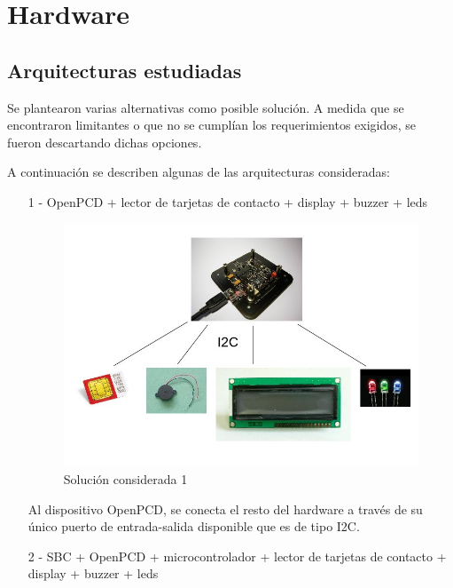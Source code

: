 \chapter{Hardware}

\section{Arquitecturas estudiadas}
Se plantearon varias alternativas como posible solución. A medida que se encontraron limitantes o que no se cumplían los requerimientos exigidos, se fueron descartando dichas opciones.

A continuación se describen algunas de las arquitecturas consideradas:

\begin{itemize}
\item[1 -] OpenPCD + lector de tarjetas de contacto + display + buzzer + leds
\bigskip

\begin{figure}[H]
\centering
  \begin{center}
  \includegraphics[scale=.4]{Imagenes/0.jpg} 
  \end{center}
  \caption{Solución considerada 1}\label{Fig:HW1} 
\end{figure}

\newpage
Al dispositivo OpenPCD, se conecta el resto del hardware a través de su único puerto de entrada-salida disponible que es de tipo I2C.

\item[2 -] SBC + OpenPCD + microcontrolador + lector de tarjetas de contacto + display + buzzer + leds
\bigskip


\end{itemize}
